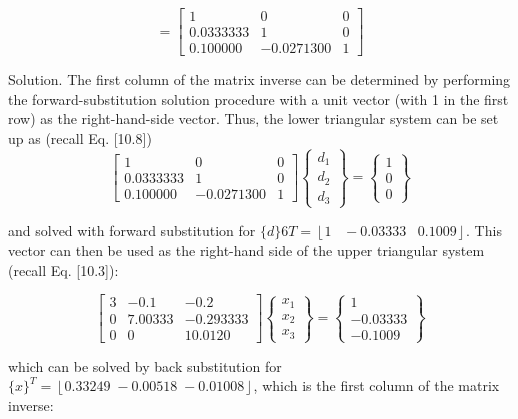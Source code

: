 \documentclass[../main.tex]{subfiles}
\begin{document}
\begin{equation}
[L]=
\begin{bmatrix}
1 & 0 & 0 \\
0.0333333 & 1 & 0 \\
0.100000 & -0.0271300 & 1
\end{bmatrix}
\end{equation}

Solution. The first column of the matrix inverse can be determined by performing the forward-substitution solution procedure with a unit vector (with 1 in the first row) as the right-hand-side vector. Thus, the lower triangular system can be set up as (recall Eq. [10.8])
\begin{equation}
\begin{bmatrix}
1 & 0 & 0\\ 
0.0333333 & 1 & 0\\ 
0.100000 & -0.0271300 & 1
\end{bmatrix}
\begin{Bmatrix}
d_{1}\\ 
d_{2}\\ 
d_{3}
\end{Bmatrix}=\begin{Bmatrix}
1\\ 
0\\ 
0
\end{Bmatrix}
\end{equation}

and solved with forward substitution for $\{d\}6{T}=\left \lfloor 1 \;\;\; -0.03333 \;\;\; 0.1009 \right \rfloor$. This vector
can then be used as the right-hand side of the upper triangular system (recall Eq. [10.3]):

\begin{equation}
\begin{bmatrix}
3 & -0.1 & -0.2\\ 
0 & 7.00333 & -0.293333\\ 
0 & 0 &  10.0120
\end{bmatrix}
\begin{Bmatrix}
x_{1}\\ 
x_{2}\\ 
x_{3}
\end{Bmatrix}=\begin{Bmatrix}
1\\ 
-0.03333\\ 
-0.1009
\end{Bmatrix}
\end{equation}

which can be solved by back substitution for $\{x\}^{T}=\left \lfloor 0.33249 \; -0.00518 \; -0.01008 \right \rfloor$, which is the first column of the matrix inverse:
\end{document}
